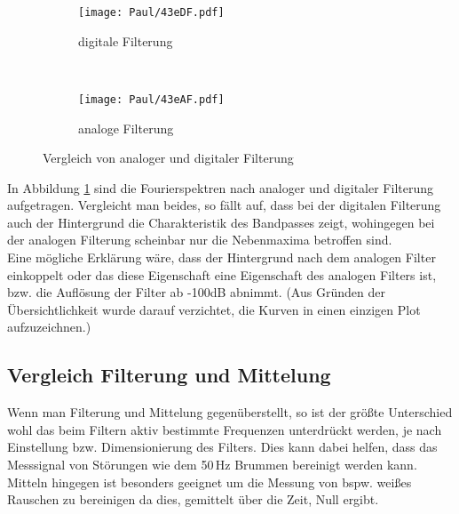 \begin{figure}[h]
    \centering
    \begin{subfigure}{0.9\textwidth}
        \centering
        \texttt{[image: Paul/43eDF.pdf]}
        \caption{digitale Filterung}
    \end{subfigure}
    \\
    \begin{subfigure}{0.9\textwidth}
        \centering
        \texttt{[image: Paul/43eAF.pdf]}
        \caption{analoge Filterung}
    \end{subfigure}
    \caption{Vergleich von analoger und digitaler Filterung}
    \label{fig:43e}
\end{figure}
\newpage
In Abbildung \ref{fig:43e} sind die Fourierspektren nach analoger und digitaler Filterung aufgetragen. Vergleicht man beides, so fällt auf, dass bei der digitalen Filterung auch der Hintergrund die Charakteristik des Bandpasses zeigt, wohingegen bei der analogen Filterung scheinbar nur die Nebenmaxima betroffen sind.\\
Eine mögliche Erklärung wäre, dass der Hintergrund nach dem analogen Filter einkoppelt oder das diese Eigenschaft eine Eigenschaft des analogen Filters ist, bzw. die Auflösung der Filter ab -100dB abnimmt. (Aus Gründen der Übersichtlichkeit wurde darauf verzichtet, die Kurven in einen einzigen Plot aufzuzeichnen.)


\subsection{Vergleich Filterung und Mittelung}
Wenn man Filterung und Mittelung gegenüberstellt, so ist der größte Unterschied wohl das beim Filtern aktiv bestimmte Frequenzen unterdrückt werden, je nach Einstellung bzw. Dimensionierung des Filters. Dies kann dabei helfen, dass das Messsignal von Störungen wie dem 50\,Hz Brummen bereinigt werden kann.\\
Mitteln hingegen ist besonders geeignet um die Messung von bspw. weißes Rauschen zu bereinigen da dies, gemittelt über die Zeit, Null ergibt.